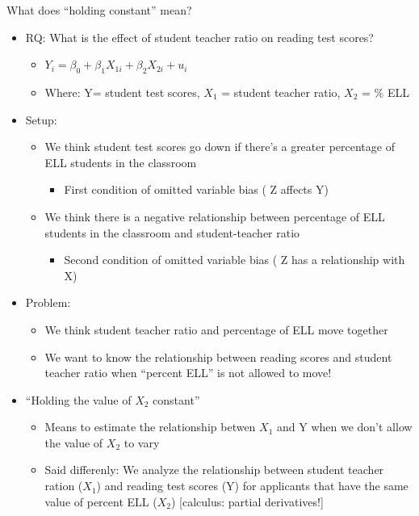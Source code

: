 \documentclass[8pt,ignorenonframetext,dvipsnames]{beamer}
\providecommand{\tightlist}{%
  \setlength{\itemsep}{0pt}\setlength{\parskip}{0pt}}
\let\olditem\item
\renewcommand{\item}{%
  \olditem\vspace{4pt}
}
\begin{document}
\begin{frame}{What does ``holding constant'' mean?}
\protect\hypertarget{what-does-holding-constant-mean}{}

\begin{itemize}
\tightlist
\item
  RQ: What is the effect of student teacher ratio on reading test
  scores?

  \begin{itemize}
  \tightlist
  \item
    \(Y_i = \beta_0 + \beta_1X_{1i} + \beta_2X_{2i} + u_i\)
  \item
    Where: Y= student test scores, \(X_1\) = student teacher ratio,
    \(X_2\) = \% ELL
  \end{itemize}
\item
  Setup:

  \begin{itemize}
  \tightlist
  \item
    We think student test scores go down if there's a greater percentage
    of ELL students in the classroom

    \begin{itemize}
    \tightlist
    \item
      First condition of omitted variable bias ( Z affects Y)
    \end{itemize}
  \item
    We think there is a negative relationship between percentage of ELL
    students in the classroom and student-teacher ratio

    \begin{itemize}
    \tightlist
    \item
      Second condition of omitted variable bias ( Z has a relationship
      with X)
    \end{itemize}
  \end{itemize}
\item
  Problem:

  \begin{itemize}
  \tightlist
  \item
    We think student teacher ratio and percentage of ELL move together
  \item
    We want to know the relationship between reading scores and student
    teacher ratio when ``percent ELL'' is not allowed to move!
  \end{itemize}
\item
  ``Holding the value of \(X_2\) constant''

  \begin{itemize}
  \tightlist
  \item
    Means to estimate the relationship betwen \(X_1\) and Y when we
    don't allow the value of \(X_2\) to vary
  \item
    Said differenly: We analyze the relationship between student teacher
    ration (\(X_1\)) and reading test scores (Y) for applicants that
    have the same value of percent ELL (\(X_2\)) {[}calculus: partial
    derivatives!{]}
  \end{itemize}
\end{itemize}

\end{frame}
\end{document}
